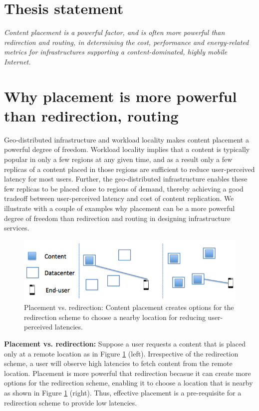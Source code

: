 \section{Thesis statement}



\emph{Content placement is a powerful factor, and is often more powerful than redirection and routing, in determining the cost, performance and energy-related metrics for infrastructures supporting a content-dominated, highly mobile Internet.}



\section{Why placement is more powerful than redirection, routing}

Geo-distributed infrastructure and workload locality makes content placement a powerful degree of freedom. Workload locality implies that a content is typically popular in only a few regions at any given time, and as a result only a few replicas of a content placed in those regions  are sufficient to reduce user-perceived latency for most users. Further, the geo-distributed infrastructure enables these few replicas to be placed close to regions of demand, thereby achieving a good tradeoff between user-perceived latency and cost of content replication. We illustrate with a couple of examples why placement can be a more powerful degree of freedom than redirection and routing in designing infrastructure services.


\begin{figure}
	
	\centering
	\includegraphics[scale=0.5]{fig/placement-vs-redirection.png}
	\caption{Placement vs. redirection: Content placement creates options for the redirection scheme to choose a nearby location for reducing user-perceived latencies.}	
	\label{fig:placement-redirection}
\end{figure}


\textbf{Placement vs. redirection:} Suppose a user requests a content that is placed only at a remote location as in Figure \ref{fig:placement-redirection} (left). Irrespective of the redirection scheme, a user will observe high latencies to fetch content from the remote location. Placement is more powerful that redirection becasue it can create more options for the redirection scheme, enabling it to choose a location that is nearby as shown in Figure \ref{fig:placement-redirection} (right). Thus, effective placement is a pre-requisite for a redirection scheme to provide low latencies.


